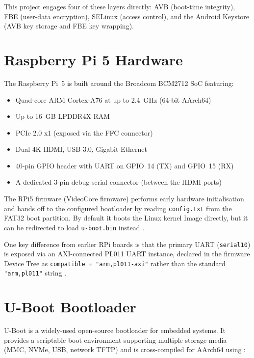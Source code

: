 This project engages four of these layers directly: AVB (boot-time integrity), FBE (user-data encryption), SELinux (access control), and the Android Keystore (AVB key storage and FBE key wrapping).

\section{Raspberry Pi 5 Hardware}
\label{sec:bg_rpi5}

The Raspberry Pi~5 is built around the Broadcom BCM2712 SoC featuring:

\begin{itemize}
    \item Quad-core ARM Cortex-A76 at up to 2.4~GHz (64-bit AArch64)
    \item Up to 16~GB LPDDR4X RAM
    \item PCIe 2.0 x1 (exposed via the FFC connector)
    \item Dual 4K HDMI, USB 3.0, Gigabit Ethernet
    \item 40-pin GPIO header with UART on GPIO~14 (TX) and GPIO~15 (RX) \cite{rpi_uart_pinout}
    \item A dedicated 3-pin debug serial connector (between the HDMI ports)
\end{itemize}

The RPi5 firmware (VideoCore firmware) performs early hardware initialisation and hands off to the configured bootloader by reading \texttt{config.txt} from the FAT32 boot partition. By default it boots the Linux kernel Image directly, but it can be redirected to load \texttt{u-boot.bin} instead \cite{rpi_hardware_docs}.

One key difference from earlier RPi boards is that the primary UART (\texttt{serial10}) is exposed via an AXI-connected PL011 UART instance, declared in the firmware Device Tree as \texttt{compatible = "arm,pl011-axi"} rather than the standard \texttt{"arm,pl011"} string \cite{arm_pl011_trm}.

\section{U-Boot Bootloader}
\label{sec:bg_uboot}

U-Boot is a widely-used open-source bootloader for embedded systems. It provides a scriptable boot environment supporting multiple storage media (MMC, NVMe, USB, network TFTP) and is cross-compiled for AArch64 using \cite{uboot_build_gcc}:

